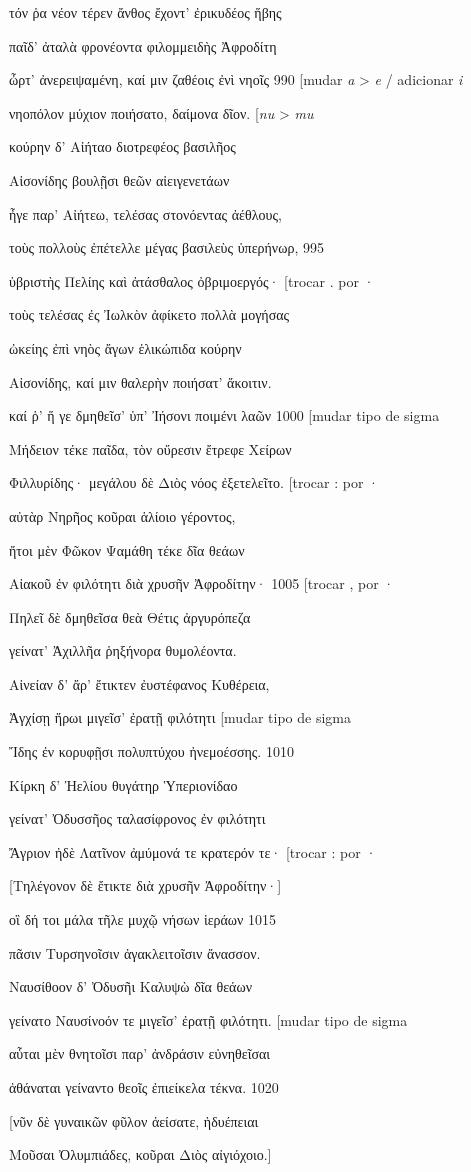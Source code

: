 τόν ῥα νέον τέρεν ἄνθος ἔχοντ' ἐρικυδέος ἥβης

παῖδ' ἀταλὰ φρονέοντα φιλομμειδὴς Ἀφροδίτη

ὦρτ' ἀνερειψαμένη, καί μιν ζαθέοις ἐνὶ νηοῖς 990 {[}mudar \emph{a}
\textgreater{} \emph{e} / adicionar \emph{i}

νηοπόλον μύχιον ποιήσατο, δαίμονα δῖον. {[}\emph{nu} \textgreater{}
\emph{mu}

κούρην δ' Αἰήταο διοτρεφέος βασιλῆος

Αἰσονίδης βουλῇσι θεῶν αἰειγενετάων

ἦγε παρ' Αἰήτεω, τελέσας στονόεντας ἀέθλους,

τοὺς πολλοὺς ἐπέτελλε μέγας βασιλεὺς ὑπερήνωρ, 995

ὑβριστὴς Πελίης καὶ ἀτάσθαλος ὀβριμοεργός· {[}trocar . por ·

τοὺς τελέσας ἐς Ἰωλκὸν ἀφίκετο πολλὰ μογήσας

ὠκείης ἐπὶ νηὸς ἄγων ἑλικώπιδα κούρην

Αἰσονίδης, καί μιν θαλερὴν ποιήσατ' ἄκοιτιν.

καί ῥ' ἥ γε δμηθεῖσ' ὑπ' Ἰήσονι ποιμένι λαῶν 1000 {[}mudar tipo de sigma

Μήδειον τέκε παῖδα, τὸν οὔρεσιν ἔτρεφε Χείρων

Φιλλυρίδης· μεγάλου δὲ Διὸς νόος ἐξετελεῖτο. {[}trocar : por ·

αὐτὰρ Νηρῆος κοῦραι ἁλίοιο γέροντος,

ἤτοι μὲν Φῶκον Ψαμάθη τέκε δῖα θεάων

Αἰακοῦ ἐν φιλότητι διὰ χρυσῆν Ἀφροδίτην· 1005 {[}trocar , por ·

Πηλεῖ δὲ δμηθεῖσα θεὰ Θέτις ἀργυρόπεζα

γείνατ' Ἀχιλλῆα ῥηξήνορα θυμολέοντα.

Αἰνείαν δ' ἄρ' ἔτικτεν ἐυστέφανος Κυθέρεια,

Ἀγχίσῃ ἥρωι μιγεῖσ' ἐρατῇ φιλότητι {[}mudar tipo de sigma

Ἴδης ἐν κορυφῇσι πολυπτύχου ἠνεμοέσσης. 1010

Κίρκη δ' Ἠελίου θυγάτηρ Ὑπεριονίδαο

γείνατ' Ὀδυσσῆος ταλασίφρονος ἐν φιλότητι

Ἄγριον ἠδὲ Λατῖνον ἀμύμονά τε κρατερόν τε· {[}trocar : por ·

{[}Τηλέγονον δὲ ἔτικτε διὰ χρυσῆν Ἀφροδίτην·{]}

οἳ δή τοι μάλα τῆλε μυχῷ νήσων ἱεράων 1015

πᾶσιν Τυρσηνοῖσιν ἀγακλειτοῖσιν ἄνασσον.

Ναυσίθοον δ' Ὀδυσῆι Καλυψὼ δῖα θεάων

γείνατο Ναυσίνοόν τε μιγεῖσ' ἐρατῇ φιλότητι. {[}mudar tipo de sigma

αὗται μὲν θνητοῖσι παρ' ἀνδράσιν εὐνηθεῖσαι

ἀθάναται γείναντο θεοῖς ἐπιείκελα τέκνα. 1020

{[}νῦν δὲ γυναικῶν φῦλον ἀείσατε, ἡδυέπειαι

Μοῦσαι Ὀλυμπιάδες, κοῦραι Διὸς αἰγιόχοιο.{]}
